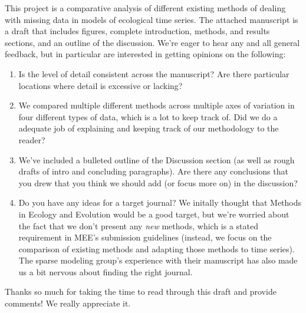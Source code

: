 \documentclass{article}
\begin{document}
This project is a comparative analysis of different existing methods of dealing with missing data in models of ecological time series. The attached manuscript is a draft that includes figures, complete introduction, methods, and results sections, and an outline of the discussion. We're eager to hear any and all general feedback, but in particular are interested in getting opinions on the following: 
\begin{enumerate}
    \item Is the level of detail consistent across the manuscript? Are there particular locations where detail is excessive or lacking? 
    \item We compared multiple different methods across multiple axes of variation in four different types of data, which is a lot to keep track of. Did we do a adequate job of explaining and keeping track of our methodology to the reader? 
    \item We've included a bulleted outline of the Discussion section (as well as rough drafts of intro and concluding paragraphs). Are there any conclusions that you drew that you think we should add (or focus more on) in the discussion? 
    \item Do you have any ideas for a target journal? We initally thought that Methods in Ecology and Evolution would be a good target, but we're worried about the fact that we don't present any \textit{new} methods, which is a stated requirement in MEE's submission guidelines (instead, we focus on the comparison of existing methods and adapting those methods to time series). The sparse modeling group's experience with their manuscript has also made us a bit nervous about finding the right journal. 
\end{enumerate}

Thanks so much for taking the time to read through this draft and provide comments! We really appreciate it. 
\end{document}
